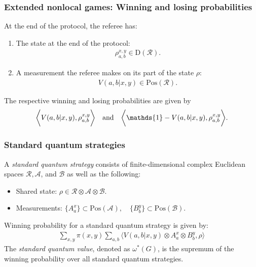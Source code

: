 \documentclass{beamer}
\def\I{\mathds{1}}
\newcommand{\biggip}[2]{\biggl\langle #1, #2 \biggr\rangle}
\def\A{\mathcal{A}}
\def\B{\mathcal{B}}
\def\R{\mathcal{R}}
\newcommand{\setft}[1]{\mathrm{#1}}
\newcommand{\Density}{\setft{D}}
\newcommand{\Pos}{\setft{Pos}}
\begin{document}
\begin{frame}
	\frametitle{Extended nonlocal games: Winning and losing probabilities}
	At the end of the protocol, the referee has: 
		\begin{enumerate}
			\item The state at the end of the protocol: 
				\begin{align*}
					\rho_{a,b}^{x,y} \in \Density(\R).
				\end{align*}
			\item A measurement the referee makes on its part of the state $\rho$: 
			\begin{align*}
				V(a,b|x,y) \in \Pos(\R).
			\end{align*}				
		\end{enumerate}
	The respective winning and losing probabilities are given by
		\begin{align*}
			\biggip{V(a,b|x,y)}{\rho_{a,b}^{x,y}} \quad \textnormal{and} \quad \biggip{\I - V(a,b|x,y)}{\rho_{a,b}^{x,y}}. 
		\end{align*}
\end{frame}

\begin{frame}
	\frametitle{Standard quantum strategies}
	A \emph{standard quantum strategy} consists of finite-dimensional complex Euclidean spaces $\R,\A$, and $\B$ as well as the following:
	\begin{itemize}
		\item Shared state: $\rho \in \R \otimes \A \otimes \B$.

		\item Measurements: $\{ A_a^x \} \subset \Pos(\A), \quad \{ B_b^y \} \subset \Pos(\B)$.
	\end{itemize}
	\pause
	\vspace{5mm}
	Winning probability for a standard quantum strategy is given by:
	\begin{align*}
		\sum_{x,y} \pi(x,y) \sum_{a,b} \biggip{V(a,b|x,y) \otimes A_a^x \otimes B_b^y}{\rho}
	\end{align*}
	The \emph{standard quantum value}, denoted as $\omega^*(G)$, is the supremum of the winning probability over all standard quantum strategies.
\end{frame}

\end{document}
